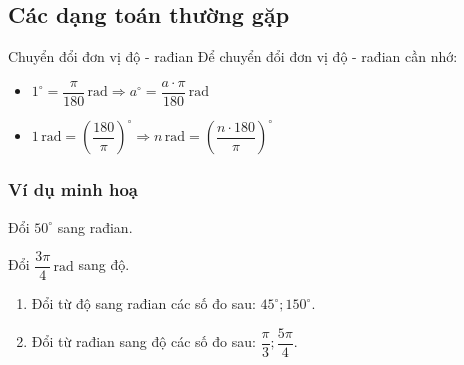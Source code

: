 \subsection{Các dạng toán thường gặp}
\begin{dang}{Chuyển đổi đơn vị độ - rađian}
	Để chuyển đổi đơn vị độ - rađian cần nhớ:
	\begin{itemize}
		\item $1^\circ=\dfrac{\pi}{180}\,\mathrm{rad}\Rightarrow a^\circ=\dfrac{a\cdot\pi}{180}\,\mathrm{rad}$
		\item $1\,\mathrm{rad}=\left(\dfrac{180}{\pi}\right)^\circ\Rightarrow n\,  \mathrm{rad}=\left(\dfrac{n\cdot180}{\pi}\right)^\circ$
	\end{itemize}
\end{dang}
\subsubsection{Ví dụ minh hoạ}
\begin{vd}%
	Đổi $50^\circ$ sang rađian.
\end{vd}
\begin{vd}%
	Đổi $\dfrac{3\pi}{4}\,\mathrm{rad}$ sang độ.
\end{vd}
\begin{vd}%
	\begin{enumerate}
		\item Đổi từ độ sang rađian các số đo sau: $45^{\circ} ; 150^{\circ}$.
		\item Đổi từ rađian sang độ các số đo sau: $\dfrac{\pi}{3} ; \dfrac{5 \pi}{4}$.
	\end{enumerate}
\end{vd}
